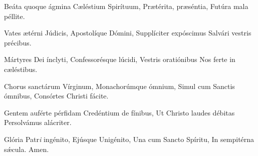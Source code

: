 Beáta quoque ágmina
Cæléstium Spirítuum,
Prætérita, præséntia,
Futúra mala péllite.

Vates ætérni Júdicis,
Apostolíque Dómini,
Supplíciter expóscimus
Salvári vestris précibus.

Mártyres Dei ínclyti,
Confessorésque lúcidi,
Vestris oratiónibus
Nos ferte in cæléstibus.

Chorus sanctárum Vírginum,
Monachorúmque ómnium,
Simul cum Sanctis ómnibus,
Consórtes Christi fácite.

Gentem auférte pérfidam
Credéntium de fínibus,
Ut Christo laudes débitas
Persolvámus alácriter.

Glória Patr\textit{i} ingénito,
Ejúsque Unigénito,
Una cum Sancto Spíritu,
In sempitérna sǽcula.
Amen.
